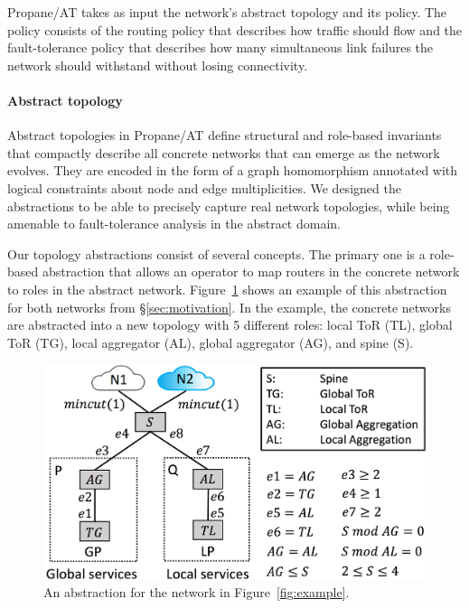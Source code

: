 \documentclass[numbers, 10pt]{sigplanconf}
\newcommand{\sysname}{{\text{}\small \sf Propane/AT}\xspace}
\newcommand{\para}[1]{\paragraph*{\textbf{#1}}}
\begin{document}

\sysname takes as input the network's abstract topology and its policy. The policy consists of the routing policy that describes how traffic should flow and the fault-tolerance policy that describes how many simultaneous link failures the network should withstand without losing connectivity.

\para{Abstract topology}
Abstract topologies in \sysname define structural and role-based invariants that compactly describe all concrete networks that can emerge as the network evolves. They are encoded in the form of a graph homomorphism annotated with logical constraints about node and edge multiplicities.
%
We designed the abstractions to be able to precisely capture real network topologies, while being amenable to fault-tolerance analysis in the abstract domain.


Our topology abstractions consist of several concepts.
The primary one is a role-based abstraction that allows an operator to map routers in the concrete network to roles in the abstract network. Figure~\ref{fig:example3} shows an example of this abstraction for both networks from \S\ref{sec:motivation}. In the example, the concrete networks are abstracted into a new topology with 5 different roles: local ToR (TL), global ToR (TG), local aggregator (AL), global aggregator (AG), and spine (S).

\begin{figure}[t!]
  \centering
  \includegraphics[width=\columnwidth]{figures/example3}
  \vspace{-1.3em}
  \caption{An abstraction for the network in Figure~\ref{fig:example}.}
  \label{fig:example3}
  \vspace{-.6em}
\end{figure}
\end{document}

